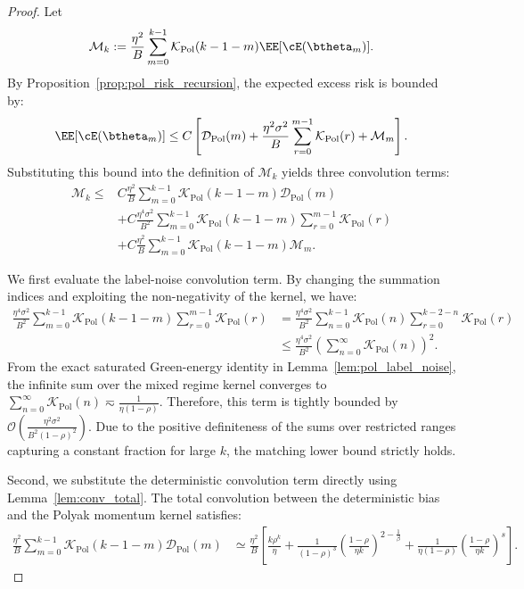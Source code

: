 \begin{proof}
Let
\[
    \mathcal M_k:=
    \frac{\eta^2}{B}\sum_{m=0}^{k-1}\mathcal K_{\mathrm{Pol}}(k-1-m)\EE[\cE(\btheta_m)].
\]
By Proposition~\ref{prop:pol_risk_recursion}, the expected excess risk is bounded by:
\[
    \EE[\cE(\btheta_m)]
    \le
    C\left[
        \mathcal D_{\mathrm{Pol}}(m)
        +\frac{\eta^2\sigma^2}{B}\sum_{r=0}^{m-1}\mathcal K_{\mathrm{Pol}}(r)
        +\mathcal M_m
    \right].
\]
Substituting this bound into the definition of $\mathcal M_k$ yields three convolution terms:
\begin{align}
\label{eq:prop_mixed_bootstrap_start}
    \mathcal M_k
    \le{}&
    C\frac{\eta^2}{B}\sum_{m=0}^{k-1}
        \mathcal K_{\mathrm{Pol}}(k-1-m)\mathcal D_{\mathrm{Pol}}(m) \nonumber \\
    & + C\frac{\eta^4\sigma^2}{B^2}\sum_{m=0}^{k-1}\mathcal K_{\mathrm{Pol}}(k-1-m)\sum_{r=0}^{m-1}\mathcal K_{\mathrm{Pol}}(r) \nonumber \\
    & + C\frac{\eta^2}{B}\sum_{m=0}^{k-1}
        \mathcal K_{\mathrm{Pol}}(k-1-m)\mathcal M_m .
\end{align}

We first evaluate the label-noise convolution term. By changing the summation indices and exploiting the non-negativity of the kernel, we have:
\begin{align*}
    \frac{\eta^4\sigma^2}{B^2}\sum_{m=0}^{k-1}\mathcal K_{\mathrm{Pol}}(k-1-m)\sum_{r=0}^{m-1}\mathcal K_{\mathrm{Pol}}(r)
    &= \frac{\eta^4\sigma^2}{B^2} \sum_{n=0}^{k-1} \mathcal K_{\mathrm{Pol}}(n) \sum_{r=0}^{k-2-n} \mathcal K_{\mathrm{Pol}}(r) \\
    &\le \frac{\eta^4\sigma^2}{B^2} \left( \sum_{n=0}^{\infty} \mathcal K_{\mathrm{Pol}}(n) \right)^2.
\end{align*}
From the exact saturated Green-energy identity in Lemma~\ref{lem:pol_label_noise}, the infinite sum over the mixed regime kernel converges to $\sum_{n=0}^{\infty} \mathcal K_{\mathrm{Pol}}(n) \eqsim \frac{1}{\eta(1-\rho)}$. Therefore, this term is tightly bounded by $\mathcal{O}\left( \frac{\eta^2\sigma^2}{B^2(1-\rho)^2} \right)$. Due to the positive definiteness of the sums over restricted ranges capturing a constant fraction for large $k$, the matching lower bound strictly holds.

Second, we substitute the deterministic convolution term directly using Lemma~\ref{lem:conv_total}. The total convolution between the deterministic bias and the Polyak momentum kernel satisfies:
\begin{align*}
    \frac{\eta^2}{B}\sum_{m=0}^{k-1}\mathcal K_{\mathrm{Pol}}(k-1-m)\mathcal D_{\mathrm{Pol}}(m)
    &\simeq \frac{\eta^2}{B} \left[ \frac{k\rho^k}{\eta} + \frac{1}{(1-\rho)^3} \left(\frac{1-\rho}{\eta k}\right)^{2-\frac{1}{\beta}} + \frac{1}{\eta(1-\rho)} \left(\frac{1-\rho}{\eta k}\right)^s \right].
\end{align*}


\end{proof}
